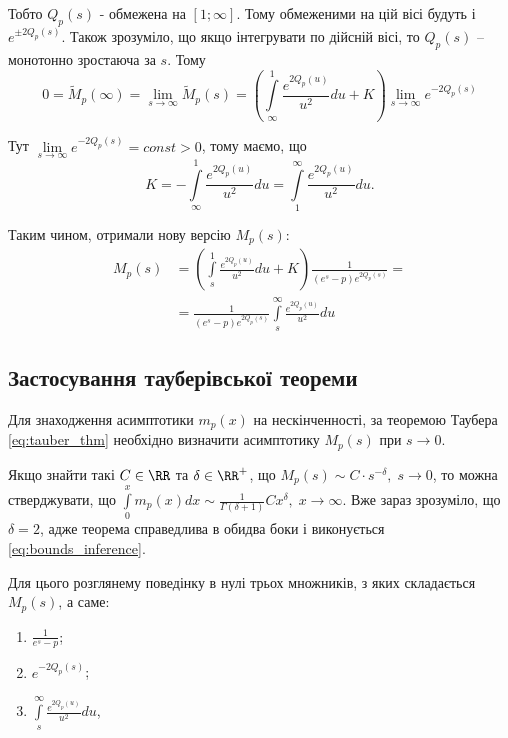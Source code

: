 Тобто $Q_p(s)$ - обмежена на $[1; \infty]$. Тому обмеженими на цій вісі будуть і $e^{\pm 2Q_p(s)}$. Також зрозуміло, що якщо інтегрувати по дійсній вісі, то $Q_p(s)$ – монотонно зростаюча за $s$. Тому
\begin{equation}
0 = \tilde M_p(\infty) = \lim_{s\rightarrow \infty} \tilde M_p(s) = \left( \int\limits_\infty^1 \frac{e^{2Q_p(u)}}{u^2} du + K \right) \lim_{s\rightarrow \infty} e^{- 2Q_p(s)}
\end{equation}

Тут $\lim\limits_{s\rightarrow \infty} e^{- 2Q_p(s)} = const > 0$, тому маємо, що
\begin{equation}
K = -  \int\limits_\infty^1 \frac{e^{2Q_p(u)}}{u^2} du =  \int\limits_1^\infty \frac{e^{2Q_p(u)}}{u^2} du.
\end{equation}

Таким чином, отримали нову версію $M_{p}(s)$:
\begin{equation}
\begin{split}
\label{eq:model_laplace_sol}
M_p(s)&= \left( \int\limits_s^1 \frac{e^{2Q_p(u)}}{u^2} du + K \right) \frac{1}{(e^s - p)  e^{2Q_p(s)}}
= \\
&=\frac{1}{(e^s - p)  e^{2Q_p(s)}} \int\limits_s^\infty \frac{e^{2Q_p(u)}}{u^2} du
\end{split}
\end{equation}

\subsection{Застосування тауберівської теореми}

Для знаходження асимптотики $m_p(x)$ на нескінченності, за теоремою Таубера \eqref{eq:tauber_thm} необхідно визначити асимптотику $M_p(s)$ при $s \rightarrow 0$.

Якщо знайти такі $C \in \RR$ та $\delta \in \RR^+$, що $M_p(s) \sim C \cdot s^{-\delta}, \; s \rightarrow 0$, то можна стверджувати, що $\int\limits_0^x m_p(x) dx \sim \frac{1}{\Gamma(\delta + 1)} C x^\delta, \; x \rightarrow \infty$. Вже зараз зрозуміло, що $\delta = 2$, адже теорема справедлива в обидва боки і виконується \eqref{eq:bounds_inference}.

Для цього розглянему поведінку в нулі трьох множників, з яких складається $M_p(s)$, а саме:
\begin{enumerate}
	\item $\displaystyle\frac{1}{e^s - p}$;
	\item $e^{-2Q_p(s)}$;
	\item $\displaystyle\int\limits_s^\infty \frac{e^{2Q_p(u)}}{u^2} du$,
\end{enumerate}

